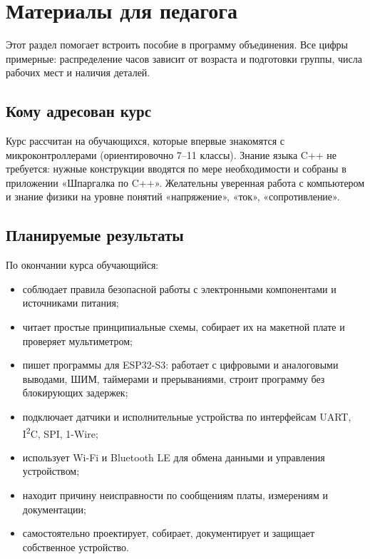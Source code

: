 \section{Материалы для педагога}
Этот раздел помогает встроить пособие в программу объединения. Все цифры примерные: распределение
часов зависит от возраста и подготовки группы, числа рабочих мест и наличия деталей.

\subsection*{Кому адресован курс}

Курс рассчитан на обучающихся, которые впервые знакомятся с микроконтроллерами (ориентировочно 7--11
классы). Знание языка C++ не требуется: нужные конструкции вводятся по мере необходимости и собраны
в приложении «Шпаргалка по C++». Желательны уверенная работа с компьютером и знание физики на уровне
понятий «напряжение», «ток», «сопротивление».

\subsection*{Планируемые результаты}

По окончании курса обучающийся:
\begin{itemize}
  \item соблюдает правила безопасной работы с электронными компонентами и источниками питания;
  \item читает простые принципиальные схемы, собирает их на макетной плате и проверяет мультиметром;
  \item пишет программы для ESP32-S3: работает с цифровыми и аналоговыми выводами, ШИМ, таймерами
        и прерываниями, строит программу без блокирующих задержек;
  \item подключает датчики и исполнительные устройства по интерфейсам UART, I\textsuperscript{2}C, SPI, 1-Wire;
  \item использует Wi-Fi и Bluetooth LE для обмена данными и управления устройством;
  \item находит причину неисправности по сообщениям платы, измерениям и документации;
  \item самостоятельно проектирует, собирает, документирует и защищает собственное устройство.
\end{itemize}


